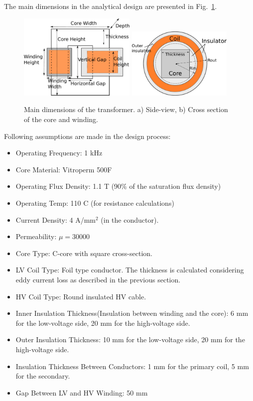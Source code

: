 \documentclass[a4paper, 11pt]{article} %
\begin{document}
The main dimensions in the analytical design are presented in Fig.~\ref{transformer_dimensions}.

\begin{figure}[]
  \centering
    \includegraphics[width=0.5\textwidth]{transformer_dimensions}
   \includegraphics[width=0.45\textwidth]{transformer_dimensions_cross_section}
  \caption{Main dimensions of the transformer. a) Side-view, b) Cross section of the core and winding.}
  \label{transformer_dimensions}
\end{figure}

Following assumptions are made in the design process:

\begin{itemize}
\item Operating Frequency: 1 kHz
\item Core Material: Vitroperm 500F
\item Operating Flux Density: 1.1 T (90\% of the saturation flux density)
\item Operating  Temp: 110 C (for resistance calculations)
\item Current Density: 4 A/mm$^2$ (in the conductor).
\item Permeability: $\mu = 30000$
\item Core Type: C-core with square cross-section.
\item LV Coil Type: Foil type conductor. The thickness is calculated considering eddy current loss as described in the previous section.
\item HV Coil Type: Round insulated HV cable.
\item Inner Insulation Thickness(Insulation between winding and the core): 6 mm for the low-voltage side, 20 mm for the high-voltage side.
\item Outer Insulation Thickness: 10 mm for the low-voltage side, 20 mm for the high-voltage side.
\item Insulation Thickness Between Conductors: 1 mm for the primary coil, 5 mm for the secondary.
\item Gap Between LV and HV Winding: 50 mm
\end{itemize}
\end{document}
